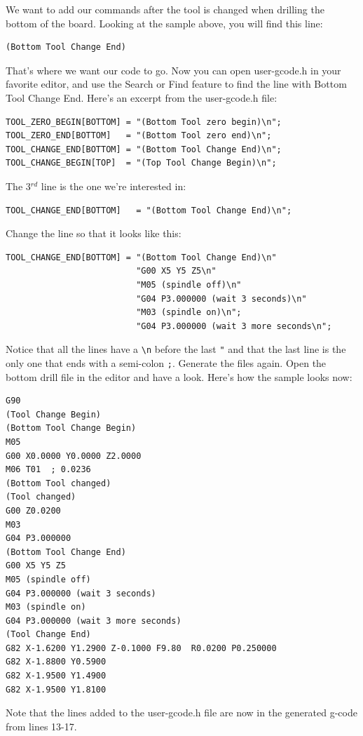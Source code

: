 \documentclass[11pt]{book}
\begin{document}
We want to add our commands after the tool is changed when drilling the bottom of the board. Looking at the sample above, you will find this line:
\begin{lstlisting}[firstnumber=12]
(Bottom Tool Change End)
\end{lstlisting}

That's where we want our code to go. Now you can open user-gcode.h in your favorite editor, and use the Search or Find feature to find the line with Bottom Tool Change End. Here's an excerpt from the user-gcode.h file:

\begin{lstlisting}
TOOL_ZERO_BEGIN[BOTTOM]	= "(Bottom Tool zero begin)\n";
TOOL_ZERO_END[BOTTOM]	= "(Bottom Tool zero end)\n";
TOOL_CHANGE_END[BOTTOM]	= "(Bottom Tool Change End)\n";
TOOL_CHANGE_BEGIN[TOP]	= "(Top Tool Change Begin)\n";
\end{lstlisting}
The 3$^{rd}$ line is the one we're interested in:
\begin{lstlisting}[firstnumber=3]
TOOL_CHANGE_END[BOTTOM]   = "(Bottom Tool Change End)\n";
\end{lstlisting}
Change the line so that it looks like this:
\begin{lstlisting}[firstnumber=3]
TOOL_CHANGE_END[BOTTOM] = "(Bottom Tool Change End)\n"
                          "G00 X5 Y5 Z5\n"
                          "M05 (spindle off)\n"
                          "G04 P3.000000 (wait 3 seconds)\n"
                          "M03 (spindle on)\n";
                          "G04 P3.000000 (wait 3 more seconds\n";
\end{lstlisting}

Notice that all the lines have a \lstinline!\n! before the last \lstinline!"! and that the last line is the only one that ends with a semi-colon \lstinline!;!.
Generate the files again. Open the bottom drill file in the editor and have a look. Here's how the sample looks now:
\begin{lstlisting}
G90
(Tool Change Begin)
(Bottom Tool Change Begin)
M05
G00 X0.0000 Y0.0000 Z2.0000
M06 T01  ; 0.0236
(Bottom Tool changed)
(Tool changed)
G00 Z0.0200
M03
G04 P3.000000
(Bottom Tool Change End)
G00 X5 Y5 Z5
M05 (spindle off)
G04 P3.000000 (wait 3 seconds)
M03 (spindle on)
G04 P3.000000 (wait 3 more seconds)
(Tool Change End)
G82 X-1.6200 Y1.2900 Z-0.1000 F9.80  R0.0200 P0.250000
G82 X-1.8800 Y0.5900
G82 X-1.9500 Y1.4900
G82 X-1.9500 Y1.8100
\end{lstlisting}
Note that the lines added to the user-gcode.h file are now in the generated g-code from lines 13-17.
\end{document}
